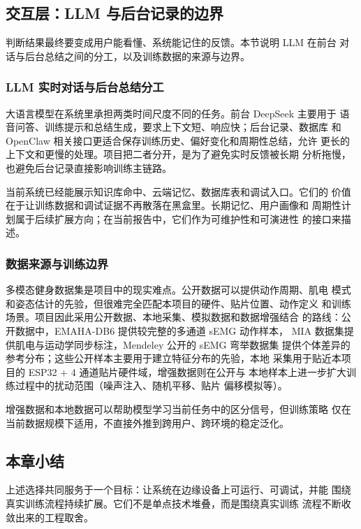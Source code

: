 \subsection{交互层：LLM 与后台记录的边界}

判断结果最终要变成用户能看懂、系统能记住的反馈。本节说明 LLM 在前台
对话与后台总结之间的分工，以及训练数据的来源与边界。

\subsubsection{LLM 实时对话与后台总结分工}

大语言模型在系统里承担两类时间尺度不同的任务。前台 DeepSeek 主要用于
语音问答、训练提示和总结生成，要求上下文短、响应快；后台记录、数据库
和 OpenClaw 相关接口更适合保存训练历史、偏好变化和周期性总结，允许
更长的上下文和更慢的处理。项目把二者分开，是为了避免实时反馈被长期
分析拖慢，也避免后台记录直接影响训练主链路。

当前系统已经能展示知识库命中、云端记忆、数据库表和调试入口。它们的
价值在于让训练数据和调试证据不再散落在黑盒里。长期记忆、用户画像和
周期性计划属于后续扩展方向；在当前报告中，它们作为可维护性和可演进性
的接口来描述。

\subsubsection{数据来源与训练边界}

多模态健身数据集是项目中的现实难点。公开数据可以提供动作周期、肌电
模式和姿态估计的先验，但很难完全匹配本项目的硬件、贴片位置、动作定义
和训练场景。项目因此采用公开数据、本地采集、模拟数据和数据增强结合
的路线：公开数据中，EMAHA-DB6 提供较完整的多通道 sEMG 动作样本，
MIA 数据集提供肌电与运动学同步标注，Mendeley 公开的 sEMG 弯举数据集
提供个体差异的参考分布；这些公开样本主要用于建立特征分布的先验，本地
采集用于贴近本项目的 ESP32 + 4 通道贴片硬件域，增强数据则在公开与
本地样本上进一步扩大训练过程中的扰动范围（噪声注入、随机平移、贴片
偏移模拟等）\cite{lara2013}。

增强数据和本地数据可以帮助模型学习当前任务中的区分信号，但训练策略
仅在当前数据规模下适用，不直接外推到跨用户、跨环境的稳定泛化。

\subsection*{本章小结}

上述选择共同服务于一个目标：让系统在边缘设备上可运行、可调试，并能
围绕真实训练流程持续扩展。它们不是单点技术堆叠，而是围绕真实训练
流程不断收敛出来的工程取舍。

